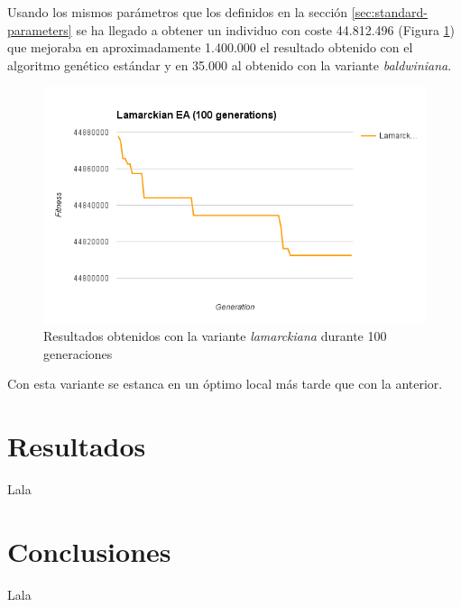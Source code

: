 Usando los mismos parámetros que los definidos en la sección \ref{sec:standard-parameters} se ha llegado a obtener un individuo con coste 44.812.496 (Figura \ref{fig:lamarckian-ea}) que mejoraba en aproximadamente 1.400.000 el resultado obtenido con el algoritmo genético estándar y en 35.000 al obtenido con la variante \textit{baldwiniana}.

\begin{figure}[H]
	\centering
	\includegraphics[width=14cm]{img/lamarckian-ea}
	\caption{Resultados obtenidos con la variante \textit{lamarckiana} durante 100 generaciones}
	\label{fig:lamarckian-ea}
\end{figure}

Con esta variante se estanca en un óptimo local más tarde que con la anterior.

\section{Resultados}

Lala

\section{Conclusiones}

Lala



\newpage


